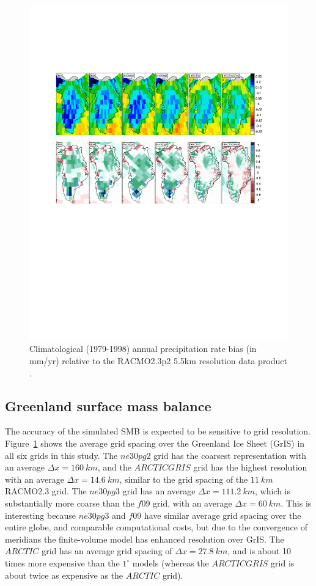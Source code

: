 \documentclass[draft]{agujournal2019}
\begin{document}
\begin{figure}[t]
\begin{center}
         \includegraphics[width=130mm]{figs/temp_contours_diffCERESdiffRACMO_CLOUD_PRECIP.pdf}
\end{center}
\caption{Climatological (1979-1998) annual precipitation rate bias (in mm/yr) relative to the RACMO2.3p2 5.5km resolution data product \cite{NETAL2019SCIENCE}.}
\label{fig:prect}
\end{figure}

\subsection{Greenland surface mass balance}

The accuracy of the simulated SMB is expected to be sensitive to grid resolution. Figure~\ref{fig:prect} shows the average grid spacing over the Greenland Ice Sheet (GrIS) in all six grids in this study. The $ne30pg2$ grid has the coarsest representation with an average $\Delta x=160~km$, and the $ARCTICGRIS$ grid has the highest resolution with an average $\Delta x=14.6~km$, similar to the grid spacing of the $11~km$ RACMO2.3 grid. The $ne30pg3$ grid has an average $\Delta x=111.2~km$, which is substantially more coarse than the $f09$ grid, with an average $\Delta x=60~km$. This is interesting because $ne30pg3$ and $f09$ have similar average grid spacing over the entire globe, and comparable computational costs, but due to the convergence of meridians the finite-volume model has enhanced resolution over GrIS. The $ARCTIC$ grid has an average grid spacing of $\Delta x=27.8~km$, and is about 10 times more expensive than the $1^{\circ}$ models (whereas the $ARCTICGRIS$ grid is about twice as expensive as the $ARCTIC$ grid).
\end{document}
